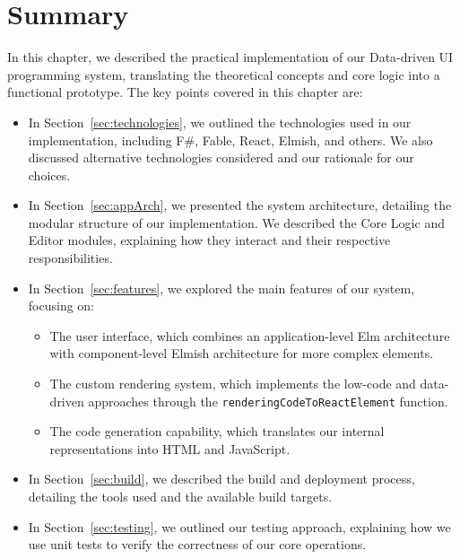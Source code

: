 \clearpage
\section{Summary}

In this chapter, we described the practical implementation of our Data-driven UI programming system,
translating the theoretical concepts and core logic into a functional prototype.
The key points covered in this chapter are:

\begin{itemize}
	\item In Section~\ref{sec:technologies}, we outlined the technologies used in our implementation, including F\#, Fable, React, Elmish, and others.
	      We also discussed alternative technologies considered and our rationale for our choices.

	\item In Section~\ref{sec:appArch}, we presented the system architecture,
	      detailing the modular structure of our implementation.
	      We described the Core Logic and Editor modules, explaining how they interact and their respective responsibilities.

	\item In Section~\ref{sec:features}, we explored the main features of our system, focusing on:
	      \begin{itemize}
		      \item The user interface, which combines an application-level Elm architecture with component-level Elmish architecture for more complex elements.
		      \item The custom rendering system, which implements the low-code and data-driven approaches through the \texttt{renderingCodeToReactElement} function.
		      \item The code generation capability, which translates our internal representations into HTML and JavaScript.
	      \end{itemize}

	\item In Section~\ref{sec:build}, we described the build and deployment process, detailing the tools used and the available build targets.

	\item In Section~\ref{sec:testing}, we outlined our testing approach, explaining how we use unit tests to verify the correctness of our core operations.
\end{itemize}






